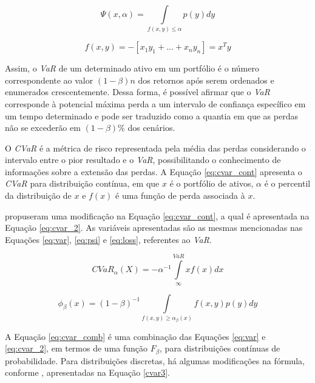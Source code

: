 \documentclass[11pt]{article}
\begin{document}
    \begin{equation} \label{eq:psi}
        \Psi(x,\alpha) = \int\limits_{f(x,y) \leq \alpha}^{} p(y)dy
    \end{equation}
    
    \begin{equation} \label{eq:loss}
        f(x,y) = - [x_{1}y_{1} + ... + x_{n}y_{n}] = x^{T}y
    \end{equation}
    
    Assim, o \textit{VaR} de um determinado ativo em um portfólio é o número correspondente ao valor $(1-\beta)n$ dos retornos após serem ordenados e enumerados crescentemente. Dessa forma, é possível afirmar que o \textit{VaR} corresponde à potencial máxima perda a um intervalo de confiança específico em um tempo determinado e pode ser traduzido como a quantia em que as perdas não se excederão em $(1- \beta)$\% dos cenários. \cite{puc}
    
    O \textit{CVaR} é a métrica de risco representada pela média das perdas considerando o intervalo entre o pior resultado e o \textit{VaR}, possibilitando o conhecimento de informações sobre a extensão das perdas. A Equação \ref{eq:cvar_cont} apresenta o \textit{CVaR} para distribuição contínua, em que $x$ é o portfólio de ativos, $\alpha$ é o percentil da distribuição de $x$ e $f(x)$ é uma função de perda associada à $x$. \cite{Araujo2015}
    
     propuseram uma modificação na Equação \ref{eq:cvar_cont}, a qual é apresentada na Equação \ref{eq:cvar_2}. As variáveis apresentadas são as mesmas mencionadas nas Equações \ref{eq:var}, \ref{eq:psi} e \ref{eq:loss}, referentes ao \textit{VaR}.
    
    \begin{equation} \label{eq:cvar_cont}
        CVaR_{\alpha}(X) = -\alpha^{-1} \int\limits^{VaR}_{\infty} x f(x) dx
    \end{equation}
    
    \begin{equation} \label{eq:cvar_2}
        \phi_{\beta}(x) = (1 - \beta)^{-1} \int\limits_{f(x,y) \geq \alpha_{\beta}(x)} f(x,y) p(y) dy
    \end{equation}


        
    A Equação \ref{eq:cvar_comb} é uma combinação das Equações \ref{eq:var} e \ref{eq:cvar_2}, em termos de uma função $F_{\beta}$, para distribuições contínuas de probabilidade. Para distribuições discretas, há algumas modificações na fórmula, conforme \cite{Araujo2015}, apresentadas na Equação \ref{cvar3}.
        
\end{document}
